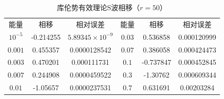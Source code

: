 \documentclass[hyperref,cs4size,titlepage,twoside]{ctexart}
\begin{document}
\clearpage
\begin{table}[!htbp]
  \centering
  \begin{tabular}{|cccccc|}
    \hline
    能量 & 相移 & 相对误差 & 能量 & 相移 & 相对误差 \\
    $10^{-5}$ & -0.214255 & $5.89345\times10^{-9}$ & $0.03$ & 0.536858 & 0.000120999 \\
    $0.001$ & 0.455357 & 0.0000128542 & $0.07$ & 0.386058 & 0.000424473 \\
    $0.003$ & 0.470201 & 0.000111731 & $0.1$ & -0.737847 & 0.000452845 \\
    $0.007$ & 0.244908 & 0.0000459522 & $0.3$ & -1.30762 & 0.000609344 \\
    $0.01$ & -1.05657 & 0.0000237531 & $0.7$ & 0.631691 & 0.00203284 \\
    \hline
  \end{tabular}
  \caption{库伦势有效理论S波相移（$r=50$）}
\end{table}
\end{document}
